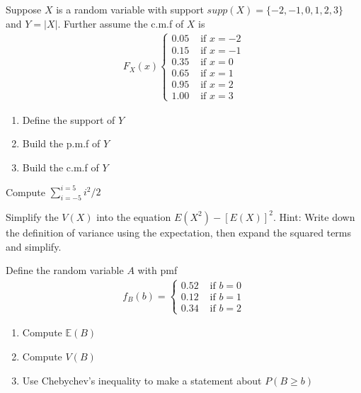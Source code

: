 \documentclass[krantz1,ChapterTOCs]{krantz}
\begin{document}
\begin{enumerate}
\begin{enumerate}
     \end{enumerate}

    \item Suppose $X$ is a random variable with support $supp(X) = \{-2,-1,0,1,2,3\}$ and $Y = |X|$. Further assume the c.m.f of $X$ is 
    \begin{align}
        F_{X}(x) \begin{cases}
                     0.05 & \text{ if } x=-2\\
                     0.15 & \text{ if } x=-1\\
                     0.35 & \text{ if } x=0\\
                     0.65 & \text{ if } x=1\\
                     0.95 & \text{ if } x=2\\
                     1.00 & \text{ if } x=3
                  \end{cases}
    \end{align}
    \begin{enumerate}
            \item Define the support of $Y$
        \item Build the p.m.f of $Y$
        \item Build the c.m.f of $Y$
    \end{enumerate}
    
    \item Compute $\sum_{i=-5}^{i=5} i^{2}/2$
    
    \item Simplify the $V(X)$ into the equation $E(X^{2}) - \left[E(X)\right]^{2}$. Hint: Write down the definition of variance using the expectation, then expand the squared terms and simplify.
    
    \item Define the random variable $A$ with pmf
    \begin{align}
        f_{B}(b) = \begin{cases}
                      0.52 &\text{ if } b=0\\
                      0.12 &\text{ if } b=1\\
                      0.34 &\text{ if } b=2
                   \end{cases}
    \end{align} 
    \begin{enumerate}
        \item Compute $\mathbb{E}(B)$
        \item Compute $V(B)$
        \item Use Chebychev's inequality to make a statement about $P(B \geq b)$ 
    \end{enumerate}
    
\end{document}

